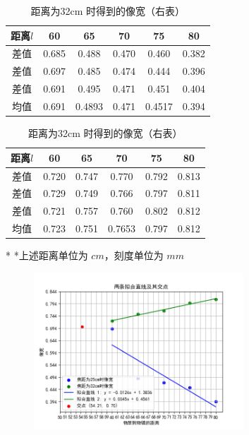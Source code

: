 \documentclass[UTF8]{ctexart}
\begin{document}
\begin{table}[H]
\centering
\caption{改变物镜与目镜之间的距离测量像宽}
\begin{minipage}{0.485\linewidth}
\centering
\caption*{距离为25cm 时得到的像宽（左表）}
\begin{tabular}{c|c|c|c|c|c|}
\toprule[1pt]
\midrule
距离$l$  & 60 & 65 & 70 & 75 & 80 \\
\midrule
差值  & 0.685 & 0.488 & 0.470 & 0.460 & 0.382\\
\midrule
差值  & 0.697 & 0.485 & 0.474 & 0.444 & 0.396 \\
\midrule
差值  & 0.691  & 0.495 & 0.471 & 0.451  &  0.404\\
\midrule
均值  & 0.691 & 0.4893 & 0.471 & 0.4517 & 0.394\\
\midrule
\bottomrule[1pt]
\end{tabular}
\end{minipage}%
\hspace{0.05\linewidth} %
\begin{minipage}{0.40\linewidth}
\centering
\caption*{距离为32cm 时得到的像宽（右表）}
\begin{tabular}{c|c|c|c|c|c}
\toprule[1pt]
\midrule
距离$l$  & 60 & 65 & 70 & 75 & 80 \\
\midrule
差值  & 0.720 & 0.747 & 0.770 & 0.792 & 0.813 \\
\midrule
差值  & 0.729 & 0.749 & 0.766 & 0.797 & 0.811 \\
\midrule
差值  & 0.721 & 0.757 & 0.760 & 0.802 & 0.812 \\
\midrule
均值  & 0.723 & 0.751 & 0.7653 & 0.797 & 0.812 \\
\midrule
\bottomrule[1pt]
\end{tabular}
\end{minipage}
\begin{tablenotes}
\centering
    \footnotesize
    \item[*] *上述距离单位为 $cm$，刻度单位为 $mm$
\end{tablenotes}
\end{table}


\begin{figure}[H]  %
		\centering
		\includegraphics[width=0.7\textwidth,height=0.5\textwidth]{img/两条直线方程及其交点1.png}
		\label{fig:side:b} 
\end{figure}
\end{document}
